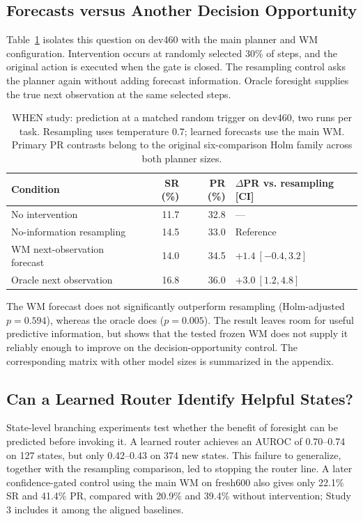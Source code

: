\documentclass[runningheads]{llncs}
\begin{document}
\subsection{Forecasts versus Another Decision Opportunity}
Table~\ref{tab:when-resampling} isolates this question on dev460 with the main planner and WM configuration. Intervention occurs at randomly selected 30\% of steps, and the original action is executed when the gate is closed. The resampling control asks the planner again without adding forecast information. Oracle foresight supplies the true next observation at the same selected steps.

\begin{table}[tbp]
\caption{WHEN study: prediction at a matched random trigger on dev460, two runs per task. Resampling uses temperature 0.7; learned forecasts use the main WM. Primary PR contrasts belong to the original six-comparison Holm family across both planner sizes.}
\label{tab:when-resampling}\centering
\begin{tabular}{lrrl}\toprule
Condition & SR (\%) & PR (\%) & $\Delta$PR vs. resampling [CI]\\\midrule
No intervention & 11.7 & 32.8 & ---\\
No-information resampling & 14.5 & 33.0 & Reference\\
WM next-observation forecast & 14.0 & 34.5 & $+1.4\ [-0.4,3.2]$\\
Oracle next observation & 16.8 & 36.0 & $+3.0\ [1.2,4.8]$\\\bottomrule
\end{tabular}
\end{table}

The WM forecast does not significantly outperform resampling (Holm-adjusted $p=0.594$), whereas the oracle does ($p=0.005$). The result leaves room for useful predictive information, but shows that the tested frozen WM does not supply it reliably enough to improve on the decision-opportunity control. The corresponding matrix with other model sizes is summarized in the appendix.

\subsection{Can a Learned Router Identify Helpful States?}
State-level branching experiments test whether the benefit of foresight can be predicted before invoking it. A learned router achieves an AUROC of 0.70--0.74 on 127 states, but only 0.42--0.43 on 374 new states. This failure to generalize, together with the resampling comparison, led to stopping the router line. A later confidence-gated control using the main WM on fresh600 also gives only 22.1\% SR and 41.4\% PR, compared with 20.9\% and 39.4\% without intervention; Study 3 includes it among the aligned baselines.
\end{document}

